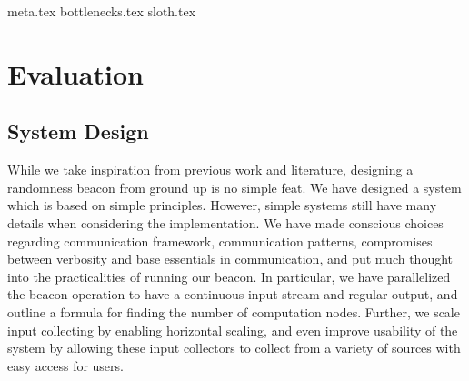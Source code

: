 {meta.tex}
{bottlenecks.tex}
{sloth.tex}

\section{Evaluation}


\subsection{System Design}
While we take inspiration from previous work and literature, designing a randomness beacon from ground up is no simple feat. We have designed a system which is based on simple principles. However, simple systems still have many details when considering the implementation. We have made conscious choices regarding communication framework, communication patterns, compromises between verbosity and base essentials in communication, and put much thought into the practicalities of running our beacon. In particular, we have parallelized the beacon operation to have a continuous input stream and regular output, and outline a formula for finding the number of computation nodes. Further, we scale input collecting by enabling horizontal scaling, and even improve usability of the system by allowing these input collectors to collect from a variety of sources with easy access for users.
